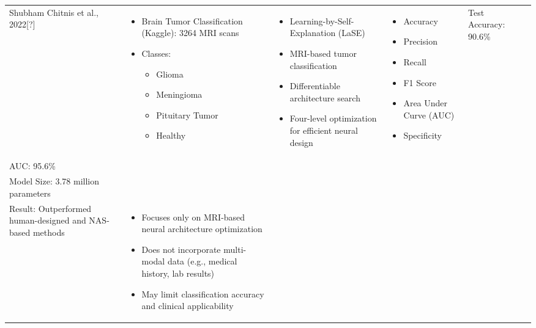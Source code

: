 \documentclass[12pt]{article}
\begin{document}
\begin{longtable}{|>{\RaggedRight}p{2.5cm}|>{\RaggedRight}p{2.8cm}|>{\RaggedRight}p{4cm}|>{\RaggedRight}p{2.8cm}|>{\RaggedRight}p{3.2cm}|>{\RaggedRight}p{3.5cm}|}
Shubham Chitnis et al., 2022[?] & 
\begin{itemize}[leftmargin=8pt, itemsep=1pt, parsep=0pt]
\item Brain Tumor Classification (Kaggle): 3264 MRI scans
\item Classes:
  \begin{itemize}[leftmargin=8pt, itemsep=1pt, parsep=0pt]
  \item Glioma
  \item Meningioma  
  \item Pituitary Tumor
  \item Healthy
  \end{itemize}
\end{itemize} & 
\begin{itemize}[leftmargin=8pt, itemsep=1pt, parsep=0pt]
\item Learning-by-Self-Explanation (LaSE)
\item MRI-based tumor classification
\item Differentiable architecture search
\item Four-level optimization for efficient neural design
\end{itemize} & 
\begin{itemize}[leftmargin=8pt, itemsep=1pt, parsep=0pt]
\item Accuracy
\item Precision
\item Recall
\item F1 Score
\item Area Under Curve (AUC)
\item Specificity
\end{itemize} & 
Test Accuracy: 90.6\%\\
AUC: 95.6\%\\
Model Size: 3.78 million parameters\\
Result: Outperformed human-designed and NAS-based methods & 
\begin{itemize}[leftmargin=8pt, itemsep=1pt, parsep=0pt]
\item Focuses only on MRI-based neural architecture optimization
\item Does not incorporate multi-modal data (e.g., medical history, lab results)
\item May limit classification accuracy and clinical applicability
\end{itemize} \\
\hline

\end{longtable}
\end{document}
